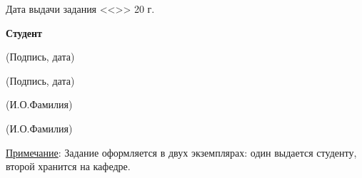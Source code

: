\begin{titlepage}
\begin{center}
    \uline{\hfill\hfill}

    {\flushleft
        Дата выдачи задания <<\hspace{1.5em}>>
        \uline{\hspace{4em}} 
        20\uline{\hspace{1em}} г.
    \hfill}

\end{center}

\begin{adjustbox}{minipage=0.35\textwidth,valign=T}
    \begin{flushleft}
        \footnotesize
        \textbf{\wleadprefix}
    \end{flushleft}
        \vspace{0em}
    \begin{flushleft}
        \footnotesize
        \textbf{Студент}
    \end{flushleft}
\end{adjustbox}
\hfill
\begin{adjustbox}{minipage=0.3\linewidth,valign=T}
        \vspace{7pt}

    \begin{center}
        \footnotesize
        \uline{\hfill}

        \scriptsize
        (Подпись, дата)
    \end{center}
    \begin{center}
        \footnotesize
        \uline{\hfill}

        \scriptsize
        (Подпись, дата)
    \end{center}
\end{adjustbox}
\hfill
\begin{adjustbox}{minipage=0.3\linewidth,valign=T}
    \wauthorspace\begin{center}
        \footnotesize
        \uline{\hfill\wfirstlead\hfill}

        \scriptsize
        (И.О.Фамилия)
    \end{center}
    \begin{center}
        \footnotesize
        \uline{\hfill\wauthor\hfill}

        \scriptsize
        (И.О.Фамилия)
    \end{center}
\end{adjustbox}

\vfill

\begin{flushleft}
\uline{Примечание}: Задание оформляется в двух экземплярах: один выдается
студенту, второй хранится на кафедре.
\end{flushleft}

\end{titlepage}
